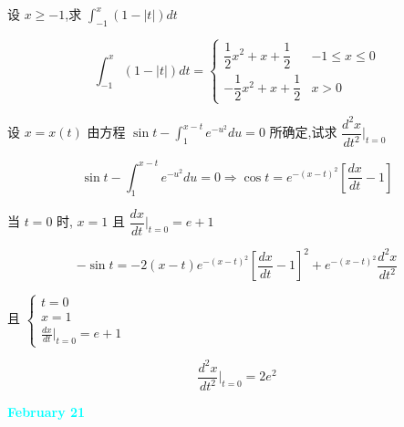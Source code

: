 \begin{example}[][Exam: 28.3.10]
	设 $x\geq -1$,求 $\int_{-1}^{x}(1-|t|)dt$
\end{example}
\begin{solution}

	$$\int_{-1}^{x}(1-|t|)dt = 
	\begin{cases}
		\dfrac{1}{2}x^{2} + x + \dfrac{1}{2} & -1 \leq x \leq 0\\
		-\dfrac{1}{2}x^{2} + x + \dfrac{1}{2} & x > 0
	\end{cases}$$
\end{solution}
\begin{example}[][Exam: 28.3.11]
	设 $x=x(t)$ 由方程 $\displaystyle{\sin t-\int_{1}^{x-t}e^{-u^{2}}du=0}$ 所确定,试求 $\dfrac{d^{2}x}{dt^{2}}\big|_{t=0}$
\end{example}
\begin{solution}
	$$\sin t -\int_{1}^{x-t}e^{-u^{2}}du = 0\Rightarrow \cos t = e^{-(x-t)^{2}}\left[\dfrac{dx}{dt}-1\right]$$

	当 $t = 0$ 时, $x = 1$ 且 $\dfrac{dx}{dt}\big|_{t = 0} = e + 1$

	$$-\sin t = -2(x-t)e^{-(x-t)^{2}}\left[\dfrac{dx}{dt}-1\right]^{2} + e^{-(x-t)^{2}}\dfrac{d^{2}x}{dt^{2}}$$

	且 $\begin{cases}
	  t = 0\\
	  x = 1\\
	  \frac{dx}{dt}\big|_{t = 0} = e + 1 
	\end{cases}$

	$$\dfrac{d^{2}x}{dt^{2}}\big|_{t = 0} = 2e^{2}$$
\end{solution}

\textcolor{cyan}{\textbf{February 21}}

